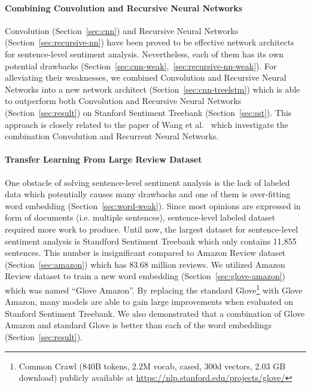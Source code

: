 \paragraph{Combining Convolution and Recursive Neural Networks}Convolution (Section~\ref{sec:cnn}) and Recursive Neural Networks (Section~\ref{sec:recursive-nn}) have been proved to be effective network architects for sentence-level sentiment analysis.
	Nevertheless, each of them has its own potential drawbacks (Section~\ref{sec:cnn-weak},~\ref{sec:recursive-nn-weak}).
	For alleviating their weaknesses, we combined Convolution and Recursive Neural Networks into a new network architect (Section~\ref{sec:cnn-treelstm}) which is able to outperform both Convolution and Recursive Neural Networks (Section~\ref{sec:result}) on Stanford Sentiment Treebank (Section~\ref{sec:sst}).
	This approach is closely related to the paper of Wang et al.~\cite{cnn-rnn} which investigate the combination Convolution and Recurrent Neural Networks.
\paragraph{Transfer Learning From Large Review Dataset} One obstacle of solving sentence-level sentiment analysis is the lack of labeled data which potentially causes many drawbacks and one of them is over-fitting word embedding (Section~\ref{sec:word-weak}).
	Since most opinions are expressed in form of  documents (i.e. multiple sentences), sentence-level labeled dataset required more work to produce.
	Until now, the largest dataset for sentence-level sentiment analysis is Standford Sentiment Treebank which only contains 11,855 sentences.
	This number is insignificant compared to Amazon Review dataset (Section~\ref{sec:amazon}) which has 83.68 million reviews.
	We utilized Amazon Review dataset to train a new word embedding (Section~\ref{sec:glove-amazon}) which was named ``Glove Amazon''.
	By replacing the standard Glove\footnote{Common Crawl (840B tokens, 2.2M vocab, cased, 300d vectors, 2.03 GB download) publicly available at \url{https://nlp.stanford.edu/projects/glove/}} with Glove Amazon, many models are able to gain large improvements when evaluated on Stanford Sentiment Treebank.
	We also demonstrated that a combination of Glove Amazon and standard Glove is better than each of the word embeddings (Section~\ref{sec:result}).

